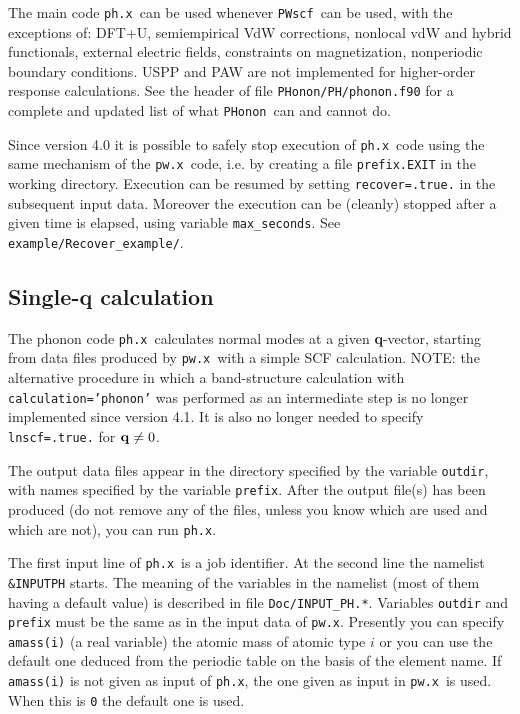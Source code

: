 \documentclass[12pt,a4paper]{article}
\def\pwx{\texttt{pw.x}}
\def\phx{\texttt{ph.x}}
\def\PWscf{\texttt{PWscf}}
\def\PHonon{\texttt{PHonon}}
\begin{document}
The main code \phx\ can be used whenever \PWscf\ can be used, 
with the exceptions of: DFT+U, semiempirical VdW corrections,
nonlocal vdW and hybrid functionals, external electric fields,
constraints on magnetization, nonperiodic boundary conditions.
USPP and PAW are not implemented for higher-order response calculations.
See the header of file \texttt{PHonon/PH/phonon.f90} for a complete and
updated list of what \PHonon\ can and cannot do.

Since version 4.0 it is possible to safely stop execution of \phx\ code using
the same mechanism of the \pwx\ code, i.e. by creating a file 
\texttt{prefix.EXIT} in the working directory. Execution can be resumed by 
setting \texttt{recover=.true.} in the subsequent input data.
Moreover the execution can be (cleanly) stopped after a given time is elapsed,
using variable \texttt{max\_seconds}. See \texttt{example/Recover\_example/}.

\subsection{Single-{\bf q} calculation}

The phonon code \phx\ calculates normal modes at a given {\bf q}-vector, 
starting from data files produced by \pwx\ with a simple SCF calculation.
NOTE: the alternative procedure in which a band-structure calculation 
with \texttt{calculation='phonon'} was performed as an intermediate step is no
longer implemented since version 4.1. It is also no longer needed to
specify \texttt{lnscf=.true.} for ${\bf q}\ne 0$.

The output data files appear in the directory specified by the
variable {\tt outdir}, with names specified by the variable 
{\tt prefix}. After the output file(s) has been produced (do not remove 
any of the files, unless you know which are used and which are not), 
you can run \phx.
    
The first input line of \phx\ is a job identifier. At the second line the
namelist {\tt \&INPUTPH} starts. The meaning of the variables in the namelist
(most of them having a default value) is described in file 
\texttt{Doc/INPUT\_PH.*}. Variables \texttt{outdir} and \texttt{prefix} 
must be the same as in the input data of \pwx. Presently
you can specify \texttt{amass(i)} (a real variable) the atomic mass 
of atomic type $i$ or you can use the default one deduced from the
periodic table on the basis of the element name. If 
{\tt amass(i)} is not given as input of \phx, the one given as
input in \pwx\ is used. When this is {\tt 0} the default one is used.
\end{document}
